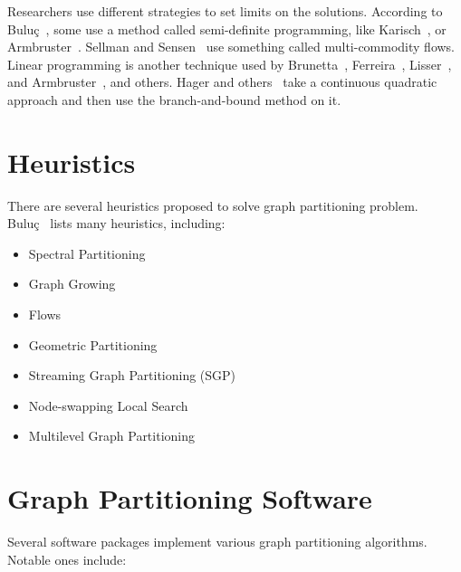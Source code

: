 \documentclass[a4paper,12pt]{report}
\begin{document}
Researchers use different strategies to set limits on the solutions. According to Buluç~\cite{buluc}, some use a method called semi-definite programming, like Karisch~\cite{karisch}, or Armbruster~\cite{armbruster}. Sellman and Sensen~\cite{sellmann, sensen} use something called multi-commodity flows. Linear programming is another technique used by Brunetta~\cite{brunetta}, Ferreira~\cite{ferreira}, Lisser~\cite{lisser}, and Armbruster~\cite{armbruster}, and others. Hager and others~\cite{hager13, hager99} take a continuous quadratic approach and then use the branch-and-bound method on it.

\section{Heuristics}

There are several heuristics proposed to solve graph partitioning problem.\\
Buluç~\cite{buluc} lists many heuristics, including:

\begin{itemize}
	\item Spectral Partitioning
	\item Graph Growing
	\item Flows
	\item Geometric Partitioning
	\item Streaming Graph Partitioning (SGP)
	\item Node-swapping Local Search
	\item Multilevel Graph Partitioning
\end{itemize}

\section{Graph Partitioning Software}

Several software packages implement various graph partitioning algorithms. Notable ones include:~\cite{buluc}
\end{document}

